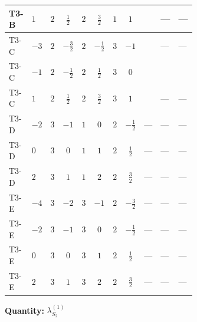 \documentclass[8pt]{article}
\begin{document}
\begin{landscape}
\begin{longtable}{@{}llcccccc >{\raggedright\arraybackslash}p{0.21\linewidth} >{\raggedright\arraybackslash}p{0.21\linewidth} >{\raggedright\arraybackslash}p{0.21\linewidth}@{}}
\midrule
T3-B & $1$ & $2$ & $\frac{1}{2}$ & $2$ & $\frac{3}{2}$ & $1$ & $1$ & \scriptsize\adjustbox{max width=\linewidth}{$\begin{gathered} +\frac{{\lambda_{HS_2}^{(A)}}^2}{4}\end{gathered}$} & --- & --- \\
\midrule
T3-C & $-3$ & $2$ & $-\frac{3}{2}$ & $2$ & $-\frac{1}{2}$ & $3$ & $-1$ & \scriptsize\adjustbox{max width=\linewidth}{$\begin{gathered} +\frac{{\lambda_{HS_2}^{(A)}}^2}{4}\end{gathered}$} & --- & --- \\
\midrule
T3-C & $-1$ & $2$ & $-\frac{1}{2}$ & $2$ & $\frac{1}{2}$ & $3$ & $0$ & \scriptsize\adjustbox{max width=\linewidth}{$\begin{gathered} +\frac{{\lambda_{HS_2}^{(A)}}^2}{4}\end{gathered}$} & \scriptsize\adjustbox{max width=\linewidth}{$\begin{gathered} {\lambda_{10}} (3 \operatorname{Tr}\!\left({y_1}\,\left({y_2}\right)^{\dagger}\right)+24 \left({\lambda_{10}}\right)^{*})\end{gathered}$} & \scriptsize\adjustbox{max width=\linewidth}{$\begin{gathered} +3 \left({\lambda_{10}}\right)^{*} \operatorname{Tr}\!\left({y_2}\,\left({y_1}\right)^{\dagger}\right)\end{gathered}$} \\
\midrule
T3-C & $1$ & $2$ & $\frac{1}{2}$ & $2$ & $\frac{3}{2}$ & $3$ & $1$ & \scriptsize\adjustbox{max width=\linewidth}{$\begin{gathered} +\frac{{\lambda_{HS_2}^{(A)}}^2}{4}\end{gathered}$} & --- & --- \\
\midrule
T3-D & $-2$ & $3$ & $-1$ & $1$ & $0$ & $2$ & $-\frac{1}{2}$ & --- & --- & --- \\
\midrule
T3-D & $0$ & $3$ & $0$ & $1$ & $1$ & $2$ & $\frac{1}{2}$ & --- & --- & --- \\
\midrule
T3-D & $2$ & $3$ & $1$ & $1$ & $2$ & $2$ & $\frac{3}{2}$ & --- & --- & --- \\
\midrule
T3-E & $-4$ & $3$ & $-2$ & $3$ & $-1$ & $2$ & $-\frac{3}{2}$ & --- & --- & --- \\
\midrule
T3-E & $-2$ & $3$ & $-1$ & $3$ & $0$ & $2$ & $-\frac{1}{2}$ & --- & --- & --- \\
\midrule
T3-E & $0$ & $3$ & $0$ & $3$ & $1$ & $2$ & $\frac{1}{2}$ & --- & --- & --- \\
\midrule
T3-E & $2$ & $3$ & $1$ & $3$ & $2$ & $2$ & $\frac{3}{2}$ & --- & --- & --- \\
\midrule
\bottomrule
\end{longtable}
\clearpage
\noindent\textbf{Quantity: }$\lambda_{S_2}^{(1)}$\par\smallskip

\end{landscape}
\end{document}
